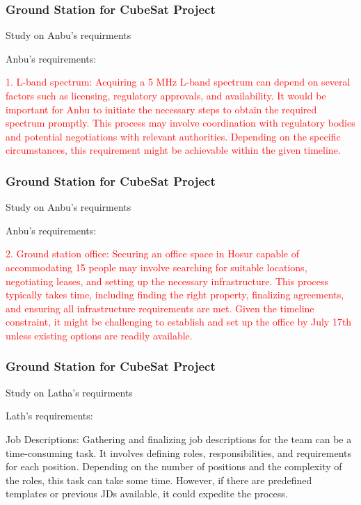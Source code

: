 \newpage
\begin{frame}
\frametitle{Ground Station for CubeSat Project }
\begin{block}{Study on Anbu's requirments}

Anbu's requirements:


\textcolor{red}{1. L-band spectrum: Acquiring a 5 MHz L-band spectrum can depend on several factors such as licensing, regulatory approvals, and availability. It would be important for Anbu to initiate the necessary steps to obtain the required spectrum promptly. This process may involve coordination with regulatory bodies and potential negotiations with relevant authorities. Depending on the specific circumstances, this requirement might be achievable within the given timeline.}

 
\end{block}
\end{frame}



\newpage
\begin{frame}
\frametitle{Ground Station for CubeSat Project }
\begin{block}{Study on Anbu's requirments}

Anbu's requirements: 


\textcolor{red}{2. Ground station office: Securing an office space in Hosur capable of accommodating 15 people may involve searching for suitable locations, negotiating leases, and setting up the necessary infrastructure. This process typically takes time, including finding the right property, finalizing agreements, and ensuring all infrastructure requirements are met. Given the timeline constraint, it might be challenging to establish and set up the office by July 17th unless existing options are readily available.}



 
\end{block}
\end{frame}


\newpage
\begin{frame}
\frametitle{Ground Station for CubeSat Project }
\begin{block}{Study on Latha's requirments}



\textcolor{red!65}{Lath's requirements:}

\textcolor{red!65}{Job Descriptions: Gathering and finalizing job descriptions for the team can be a time-consuming task. It involves defining roles, responsibilities, and requirements for each position. Depending on the number of positions and the complexity of the roles, this task can take some time. However, if there are predefined templates or previous JDs available, it could expedite the process.}




 
\end{block}
\end{frame}


